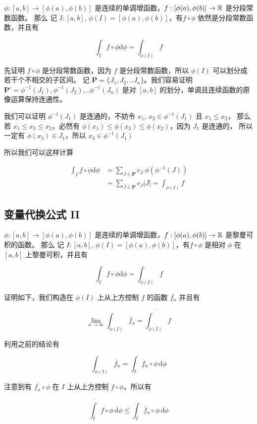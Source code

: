 $\phi: [a,b] \to [\phi(a), \phi(b)]$  是连续的单调增函数，$f: [\phi(a), \phi(b)] \to \mathbb{R}$ 是分段常数函数。
那么 记 $I: [a,b],\, \phi(I) = [\phi(a), \phi(b)]$，有$f \circ \phi$ 依然是分段常数函数，并且有

\[
\int_{I} f \circ \phi \mathrm{d} \phi = \int_{\phi(I)}f
\]

先证明 $f \circ \phi$ 是分段常数函数，因为 $f$ 是分段常数函数，所以 $\phi(I)$ 可以划分成若干个不相交的子区间。
记 $\mathbf{P} = \{J_1, J_2, .. J_n\}$。我们容易证明 $\mathbf{P'} = {\phi^{-1}(J_1),\phi^{-1}(J_2), ..\phi^{-1}(J_n)}$ 
是对 $[a,b]$ 的划分，单调且连续函数的原像运算保持连通性。

我们可以证明 $\phi^{-1}(J_1)$ 是连通的，不妨令 $x_1,\, x_2 \in \phi^{-1}(J_1)$ 且 $x_1 \le x_2$，
那么若 $x_1 \le x_3 \le x_2$，必然有 $\phi(x_1) \le \phi(x_3) \le \phi(x_2)$，因为 $J_1$ 是连通的，
所以一定有 $\phi(x_3) \in J_1$，所以 $x_3 \in \phi^{-1}(J_1)$

所以我们可以这样计算 

\begin{align*}
 \int_{I} f \circ \phi \mathrm{d} \phi &= \sum_{J \in \mathbf{P}} c_J \: \phi(\phi^{-1}(J)) \\
 &= \sum_{J \in \mathbf{P}} c_J \lvert J \rvert = \int_{\phi(I)}f
\end{align*}


\subsection{变量代换公式 II}

$\phi: [a,b] \to [\phi(a), \phi(b)]$  是连续的单调增函数，$f: [\phi(a), \phi(b)] \to \mathbb{R}$ 是黎曼可积的函数。
那么 记 $I: [a,b],\, \phi(I) = [\phi(a), \phi(b)]$，有$f \circ \phi$ 是相对 $\phi$ 在 $[a,b]$ 上黎曼可积，并且有

\[
\int_{I} f \circ \phi \mathrm{d} \phi = \int_{\phi(I)}f
\]

证明如下，我们构造在 $\phi(I)$ 上从上方控制 $f$ 的函数 $\overline{f_n}$ 并且有

\[
\lim_{n \to \infty}\int_{\phi(I)}\overline{f}_n = \overline{\int_{\phi(I)}}f
\]

利用之前的结论有

\[
\int_{\phi(I)}\overline{f}_n = \int_{I} \overline{f}_n \circ \phi \,\mathrm{d} \phi
\]

注意到有 $\overline{f_n} \circ \phi$ 在 $I$ 上从上方控制 $f \circ \phi$，所以有

\[
\overline{\int_{I}}f \circ \phi \, \mathrm{d} \phi \le \int_{I} \overline{f}_n \circ \phi \,\mathrm{d} \phi
\]


